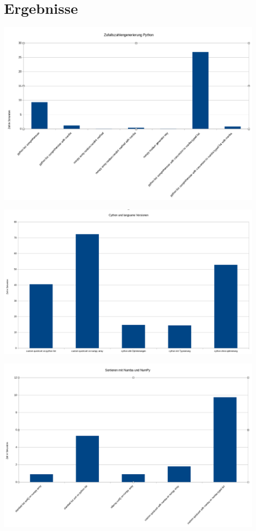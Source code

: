 \documentclass[12pt,a4paper]{article}
\begin{document}
\clearpage
\section{Ergebnisse}

\begin{center}
    \includegraphics[width=1\textwidth]{./diagramme/bilder/listengenerierung.png}
\end{center}

\begin{center}
    \includegraphics[width=1\textwidth]{./diagramme/bilder/sortierungen_cython_langsam.png}
\end{center}

\begin{center}
    \includegraphics[width=1\textwidth]{./diagramme/bilder/sortieren_numba_numpy.png}
\end{center}
\end{document}
